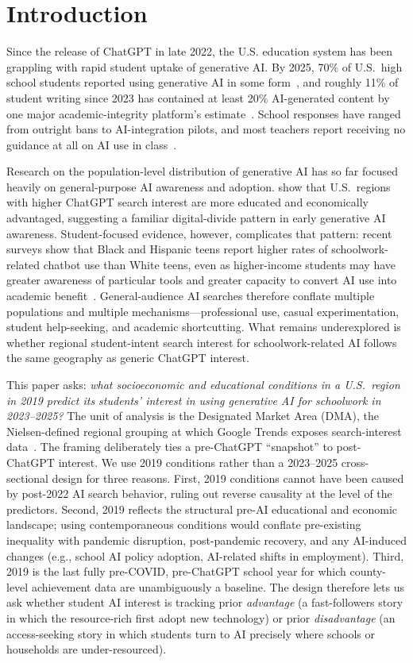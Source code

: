 \documentclass[11pt]{article}
\begin{document}
\section{Introduction}

Since the release of ChatGPT in late 2022, the U.S. education system has been grappling with rapid student uptake of generative AI. By 2025, 70\% of U.S.\ high school students reported using generative AI in some form~\citep{laird2025}, and roughly 11\% of student writing since 2023 has contained at least 20\% AI-generated content by one major academic-integrity platform's estimate~\citep{turnitin2024}. School responses have ranged from outright bans to AI-integration pilots, and most teachers report receiving no guidance at all on AI use in class~\citep{laird2025}.

Research on the population-level distribution of generative AI has so far focused heavily on general-purpose AI awareness and adoption. \citet{daepp2025} show that U.S.\ regions with higher ChatGPT search interest are more educated and economically advantaged, suggesting a familiar digital-divide pattern in early generative AI awareness. Student-focused evidence, however, complicates that pattern: recent surveys show that Black and Hispanic teens report higher rates of schoolwork-related chatbot use than White teens, even as higher-income students may have greater awareness of particular tools and greater capacity to convert AI use into academic benefit~\citep{sidoti2025, pew2026}. General-audience AI searches therefore conflate multiple populations and multiple mechanisms---professional use, casual experimentation, student help-seeking, and academic shortcutting. What remains underexplored is whether regional student-intent search interest for schoolwork-related AI follows the same geography as generic ChatGPT interest.

This paper asks: \emph{what socioeconomic and educational conditions in a U.S.\ region in 2019 predict its students' interest in using generative AI for schoolwork in 2023--2025?} The unit of analysis is the Designated Market Area (DMA), the Nielsen-defined regional grouping at which Google Trends exposes search-interest data~\citep{nielsen2025}. The framing deliberately ties a pre-ChatGPT ``snapshot'' to post-ChatGPT interest. We use 2019 conditions rather than a 2023--2025 cross-sectional design for three reasons. First, 2019 conditions cannot have been caused by post-2022 AI search behavior, ruling out reverse causality at the level of the predictors. Second, 2019 reflects the structural pre-AI educational and economic landscape; using contemporaneous conditions would conflate pre-existing inequality with pandemic disruption, post-pandemic recovery, and any AI-induced changes (e.g., school AI policy adoption, AI-related shifts in employment). Third, 2019 is the last fully pre-COVID, pre-ChatGPT school year for which county-level achievement data are unambiguously a baseline. The design therefore lets us ask whether student AI interest is tracking prior \emph{advantage} (a fast-followers story in which the resource-rich first adopt new technology) or prior \emph{disadvantage} (an access-seeking story in which students turn to AI precisely where schools or households are under-resourced).
\end{document}
